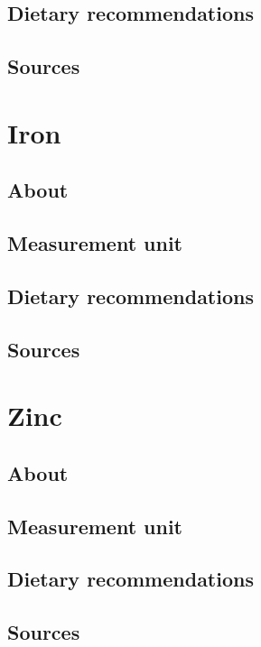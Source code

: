 \documentclass{book}
\begin{document}
\section{Dietary recommendations}


\section{Sources}


\chapter{Iron}
\section{About}


\section{Measurement unit}


\section{Dietary recommendations}


\section{Sources}


\chapter{Zinc}
\section{About}


\section{Measurement unit}


\section{Dietary recommendations}


\section{Sources}
\end{document}
